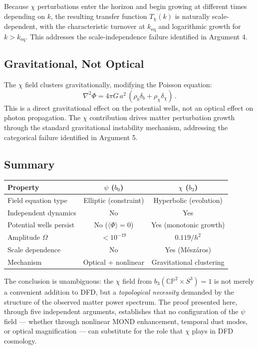 \documentclass[12pt,a4paper]{article}
\newcommand{\CP}{\mathbb{CP}}
\newcommand{\Sph}{S}
\begin{document}
Because $\chi$ perturbations enter the horizon and begin growing at
different times depending on $k$, the resulting transfer function
$T_\chi(k)$ is naturally scale-dependent, with the characteristic
turnover at $k_{\mathrm{eq}}$ and logarithmic growth for
$k > k_{\mathrm{eq}}$. This addresses the scale-independence
failure identified in Argument 4.

\subsection{Gravitational, Not Optical}

The $\chi$ field clusters gravitationally, modifying the Poisson
equation:
\begin{equation}
\nabla^2\Phi = 4\pi G\,a^2\,(\rho_b\delta_b + \rho_\chi\delta_\chi)\,.
\end{equation}
This is a direct gravitational effect on the potential wells, not
an optical effect on photon propagation. The $\chi$ contribution
drives matter perturbation growth through the standard gravitational
instability mechanism, addressing the categorical failure identified
in Argument 5.

\subsection{Summary}

\begin{center}
\begin{tabular}{lcc}
\toprule
\textbf{Property} & \textbf{$\psi$ ($b_0$)} & \textbf{$\chi$ ($b_3$)} \\
\midrule
Field equation type & Elliptic (constraint) & Hyperbolic (evolution) \\
Independent dynamics & No & Yes \\
Potential wells persist & No ($\langle\Phi\rangle = 0$) & Yes (monotonic growth) \\
Amplitude $\Omega$ & $< 10^{-19}$ & $0.119/h^2$ \\
Scale dependence & No & Yes (M\'esz\'aros) \\
Mechanism & Optical + nonlinear & Gravitational clustering \\
\bottomrule
\end{tabular}
\end{center}

\medskip

The conclusion is unambiguous: the $\chi$ field from
$b_3(\CP^2 \times \Sph^3) = 1$ is not merely a convenient addition
to DFD, but a \emph{topological necessity} demanded by the structure
of the observed matter power spectrum. The proof presented here,
through five independent arguments, establishes that no configuration
of the $\psi$ field --- whether through nonlinear MOND enhancement,
temporal dust modes, or optical magnification --- can substitute for
the role that $\chi$ plays in DFD cosmology.
\end{document}
